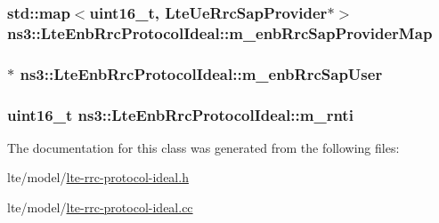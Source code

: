 \subsubsection[{\texorpdfstring{m\+\_\+enb\+Rrc\+Sap\+Provider\+Map}{m_enbRrcSapProviderMap}}]{\setlength{\rightskip}{0pt plus 5cm}std\+::map$<$uint16\+\_\+t, {\bf Lte\+Ue\+Rrc\+Sap\+Provider}$\ast$$>$ ns3\+::\+Lte\+Enb\+Rrc\+Protocol\+Ideal\+::m\+\_\+enb\+Rrc\+Sap\+Provider\+Map\hspace{0.3cm}{\ttfamily [private]}}\hypertarget{classns3_1_1LteEnbRrcProtocolIdeal_a77d0bd25d54009ce65f00acf765dd714}{}\label{classns3_1_1LteEnbRrcProtocolIdeal_a77d0bd25d54009ce65f00acf765dd714}
\subsubsection[{\texorpdfstring{m\+\_\+enb\+Rrc\+Sap\+User}{m_enbRrcSapUser}}]{$\ast$ ns3\+::\+Lte\+Enb\+Rrc\+Protocol\+Ideal\+::m\+\_\+enb\+Rrc\+Sap\+User\hspace{0.3cm}{\ttfamily [private]}}\hypertarget{classns3_1_1LteEnbRrcProtocolIdeal_a57a635e916167b82a7146bf91dd8af60}{}\label{classns3_1_1LteEnbRrcProtocolIdeal_a57a635e916167b82a7146bf91dd8af60}
\subsubsection[{\texorpdfstring{m\+\_\+rnti}{m_rnti}}]{\setlength{\rightskip}{0pt plus 5cm}uint16\+\_\+t ns3\+::\+Lte\+Enb\+Rrc\+Protocol\+Ideal\+::m\+\_\+rnti\hspace{0.3cm}{\ttfamily [private]}}\hypertarget{classns3_1_1LteEnbRrcProtocolIdeal_aaedd79c348aa54b9a6a4b28944e97638}{}\label{classns3_1_1LteEnbRrcProtocolIdeal_aaedd79c348aa54b9a6a4b28944e97638}


The documentation for this class was generated from the following files\+:\begin{DoxyCompactItemize}
\item 
lte/model/\hyperlink{lte-rrc-protocol-ideal_8h}{lte-\/rrc-\/protocol-\/ideal.\+h}\item 
lte/model/\hyperlink{lte-rrc-protocol-ideal_8cc}{lte-\/rrc-\/protocol-\/ideal.\+cc}\end{DoxyCompactItemize}
